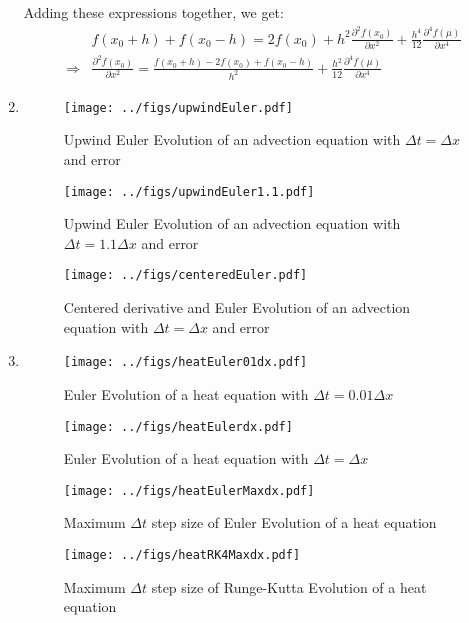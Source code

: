 \documentclass[12pt,a4]{article}
\begin{document}
\begin{enumerate}
    Adding these expressions together, we get:
    \begin{align*}
                  & f(x_0 + h) + f(x_0 - h) =  2 f(x_0) + h^2 \frac{\partial^2 f(x_0)}{\partial x^2} + \frac{h^4}{12} \frac{\partial^4 f(\mu)}{\partial x^4}\\
      \Rightarrow & \frac{\partial^2 f(x_0)}{\partial x^2} =\frac{f(x_0 + h) - 2 f(x_0) + f(x_0 - h)}{h^2}  + \frac{h^2}{12} \frac{\partial^4 f(\mu)}{\partial x^4}
    \end{align*}
  \item
    \begin{figure}[!h]
      \centering
      \texttt{[image: ../figs/upwindEuler.pdf]} 
      \caption{Upwind Euler Evolution of an advection equation with $\Delta t = \Delta x$ and error}
    \end{figure}

    \begin{figure}[!h]
      \centering
      \texttt{[image: ../figs/upwindEuler1.1.pdf]}
      \caption{Upwind Euler Evolution of an advection equation with $\Delta t = 1.1\Delta x$ and error}
    \end{figure}

    \begin{figure}[!h]
      \centering
      \texttt{[image: ../figs/centeredEuler.pdf]}
      \caption{Centered derivative and Euler Evolution of an advection equation  with $\Delta t = \Delta x$ and error}
    \end{figure}

  \item
    \iffalse
    \begin{figure}[!h]
      \centering
      \texttt{[image: ../figs/centeredEuler.pdf]}
      \caption{Euler Evolution of a heat equation with $\Delta t = \Delta x$}
    \end{figure}
    \fi

    \begin{figure}[!h]
      \centering
      \texttt{[image: ../figs/heatEuler01dx.pdf]}
      \caption{Euler Evolution of a heat equation with $\Delta t = 0.01 \Delta x$}
    \end{figure}

    \begin{figure}[!h]
      \centering
      \texttt{[image: ../figs/heatEulerdx.pdf]}
      \caption{Euler Evolution of a heat equation with $\Delta t = \Delta x$}
    \end{figure}

    \begin{figure}[!h]
      \centering
      \texttt{[image: ../figs/heatEulerMaxdx.pdf]}
      \caption{Maximum $\Delta t$ step size of Euler Evolution of a heat equation}
    \end{figure}

    \begin{figure}[!h]
      \centering
      \texttt{[image: ../figs/heatRK4Maxdx.pdf]}
      \caption{Maximum $\Delta t$ step size of Runge-Kutta Evolution of a heat equation}
    \end{figure}
\end{enumerate}
\end{document}
